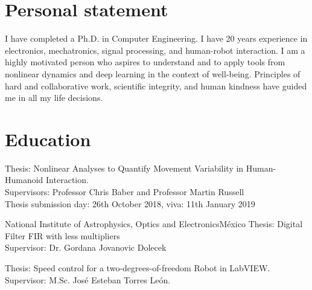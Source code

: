 \documentclass[10pt,a4paper,roman]{moderncv}
\begin{document}
\section{Personal statement}

\begin{changemargin}{2.4cm}{0.5cm}
I have completed a Ph.D. in Computer Engineering. I have 20 years experience 
in electronics, mechatronics, signal processing, and human-robot interaction.
I am a highly motivated person who aspires  
to understand and to apply tools from nonlinear dynamics and deep learning 
in the context of well-being.
Principles of hard and collaborative work, scientific integrity, 
and human kindness have guided me in all my life decisions. 
\end{changemargin}


\section{Education}
  {Thesis: Nonlinear  Analyses to Quantify Movement Variability in Human-Humanoid Interaction.
 \href{https://doi.org/10.5281/zenodo.1473140}{\faFilePdfO}
 \href{https://github.com/mxochicale/phd-thesis}{\faGithubAlt}
 \href{https://github.com/mxochicale/phd-thesis-code-data}{\faCode}
	\\ Supervisors: Professor Chris Baber and  Professor Martin Russell  
	\\ Thesis submission day: 26th October 2018, viva: 11th January 2019	
}

  {National Institute of Astrophysics, Optics and Electronics}{M\'exico}{}
  {Thesis: Digital Filter FIR with less multipliers
  \href{https://github.com/mxochicale/publications/blob/master/Thesis/M.Sc./doc/MPXochicale_MScThesis-2016.pdf}{\faFilePdfO}
  \href{https://github.com/mxochicale/publications/tree/master/Thesis/M.Sc.}{\faGithubAlt}
  \\ Supervisor: Dr. Gordana Jovanovic Dolecek}

  {Thesis: Speed control for a two-degrees-of-freedom Robot in LabVIEW.
  \href{https://github.com/mxochicale/publications/blob/master/Thesis/B.Eng./doc/MPXochicale_BachelorEngThesis-2003.pdf}{\faFilePdfO}
  \href{https://github.com/mxochicale/publications/tree/master/Thesis/B.Eng.}{\faGithubAlt}
  \\ Supervisor: M.Sc. Jos\'e Esteban Torres Le\'on.}
\end{document}
